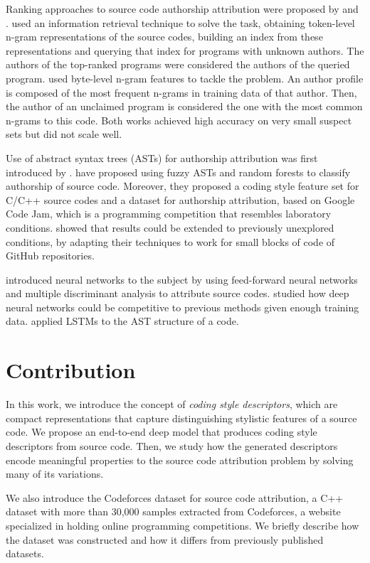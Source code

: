 Ranking approaches to source code authorship attribution were proposed by  and .  used an information retrieval technique to solve the task, obtaining token-level n-gram representations of the source codes, building an index from these representations and querying that index for programs with unknown authors. The authors of the top-ranked programs were considered the authors of the queried program.  used byte-level n-gram features to tackle the problem. An author profile is composed of the most frequent n-grams in training data of that author. Then, the author of an unclaimed program is considered the one with the most common n-grams to this code. Both works achieved high accuracy on very small suspect sets but did not scale well.

Use of abstract syntax trees (ASTs) for authorship attribution was first introduced by .  have proposed using fuzzy ASTs and random forests to classify authorship of source code. Moreover, they proposed a coding style feature set for C/C++ source codes and a dataset for authorship attribution, based on Google Code Jam, which is a programming competition that resembles laboratory conditions.  showed that  results could be extended to previously unexplored conditions, by adapting their techniques to work for small blocks of code of GitHub repositories.

 introduced neural networks to the subject by using feed-forward neural networks and multiple discriminant analysis to attribute source codes.  studied how deep neural networks could be competitive to previous methods given enough training data.  applied LSTMs to the AST structure of a code.

\section{Contribution}

In this work, we introduce the concept of \textit{coding style descriptors}, which are compact representations that capture distinguishing stylistic features of a source code. We propose an end-to-end deep model that produces coding style descriptors from source code. Then, we study how the generated descriptors encode meaningful properties to the source code attribution problem by solving many of its variations.

We also introduce the Codeforces dataset for source code attribution, a C++ dataset with more than 30,000 samples extracted from Codeforces, a website specialized in holding online programming competitions. We briefly describe how the dataset was constructed and how it differs from previously published datasets.

